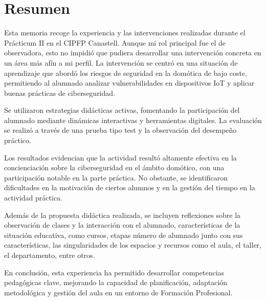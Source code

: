 \chapter{Resumen}

Esta memoria recoge la experiencia y las intervenciones realizadas durante el Prácticum II en el CIPFP Canastell. Aunque mi rol principal fue el de observadora, esto no impidió que pudiera desarrollar una intervención concreta en un área más afín a mi perfil. La intervención se centró en una situación de aprendizaje que abordó los riesgos de seguridad en la domótica de bajo coste, permitiendo al alumnado analizar vulnerabilidades en dispositivos IoT y aplicar buenas prácticas de ciberseguridad. 


Se utilizaron estrategias didácticas activas, fomentando la participación del alumnado mediante dinámicas interactivas y herramientas digitales. La evaluación se realizó a través de una prueba tipo test y la observación del desempeño práctico.

Los resultados evidencian que la actividad resultó altamente efectiva en la concienciación sobre la ciberseguridad en el ámbito domótico, con una participación notable en la parte práctica. No obstante, se identificaron dificultades en la motivación de ciertos alumnos y en la gestión del tiempo en la actividad práctica. 

Además de la propuesta didáctica realizada, se incluyen reflexiones sobre la observación de clases y la interacción con el alumnado, características de la situación educativa, como cursos, etapas número de alumnado junto con sus características, las singularidades de los espacios y recursos como el aula, el taller, el departamento, entre otros.

En conclusión, esta experiencia ha permitido desarrollar competencias pedagógicas clave, mejorando la capacidad de planificación, adaptación metodológica y gestión del aula en un entorno de Formación Profesional.

